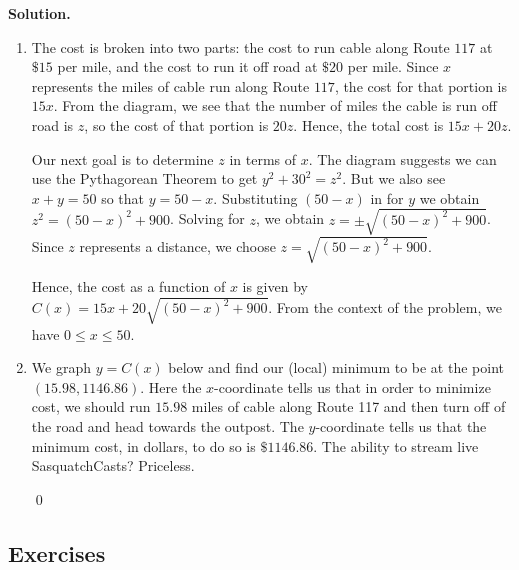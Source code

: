 \documentclass{ximera}
\begin{document}
\begin{example}
{\bf Solution.}

\begin{enumerate}

\item  The cost is broken into two parts:  the cost to run cable along Route $117$ at $\$15$ per mile, and the cost to run it off road at $\$20$ per mile.  Since $x$ represents the miles of cable run along Route $117$, the cost  for that portion is $15x$.  
From the diagram, we see that the number of miles the cable is run off road is $z$, so the cost of that portion is $20z$.  Hence, the total cost is $15x + 20z$.  

\smallskip

Our next goal is to determine $z$ in terms of $x$.  The diagram suggests we can use the Pythagorean Theorem to get $y^2+30^2 = z^2$.  But we also see $x+y = 50$ so that $y=50-x$.  Substituting $(50-x)$ in for $y$ we obtain $z^2 = (50-x)^2+900$.  Solving for $z$, we obtain $z = \pm \sqrt{(50-x)^2+900}$.  Since $z$ represents a distance, we choose $z = \sqrt{(50-x)^2+900}$.

Hence, the cost as a function of $x$  is given by $C(x) = 15x + 20\sqrt{(50-x)^2+900}$.  From the context of the problem, we have $0 \leq x \leq 50$.


\begin{center}
\end{center}

\item  We graph $y=C(x)$ below and find our (local) minimum to be at the point $(15.98, 1146.86)$.  Here the $x$-coordinate tells us that in order to minimize cost, we should run $15.98$ miles of cable along Route 117 and then turn off of the road and head towards the outpost. The $y$-coordinate tells us that the minimum cost, in dollars, to do so is $\$1146.86$.  The ability to stream live SasquatchCasts?  Priceless.

 \qed

\end{enumerate}

\end{example}

\subsection{Exercises}


\closegraphsfile
\end{document}
